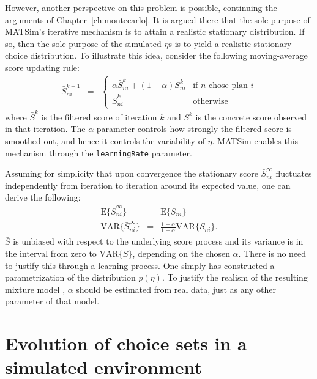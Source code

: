 However, another perspective on this problem is possible, continuing
the arguments of Chapter~\ref{ch:montecarlo}. It is argued there that
the sole purpose of MATSim's iterative mechanism is to attain a realistic
stationary distribution. If so, then the sole purpose of the simulated
$\eta$s is to yield a realistic stationary choice distribution. To
illustrate this idea, consider the following moving-average score
updating rule:
\begin{eqnarray}
\bar{S}_{ni}^{k+1} & = & \begin{cases}
\alpha\bar{S}_{ni}^{k}+(1-\alpha)S_{ni}^{k} & \text{if }n\text{ chose plan }i\\
\bar{S}_{ni}^{k} & \text{otherwise}
\end{cases}
\end{eqnarray}
where $\bar{S}^{k}$ is the filtered score of iteration $k$ and $S^{k}$
is the concrete score observed in that iteration. The $\alpha$ parameter
controls how strongly the filtered score is smoothed out, and hence
it controls the variability of $\eta$. MATSim enables this mechanism
through the \lstinline{learningRate} parameter.

Assuming for simplicity that upon convergence the stationary score
$\bar{S}_{ni}^{\infty}$ fluctuates independently from iteration to
iteration around its expected value, one can derive the following:
\begin{eqnarray}
\text{E}\{\bar{S}_{ni}^{\infty}\} & = & \text{E}\{S_{ni}\}\\
\text{VAR}\{\bar{S}_{ni}^{\infty}\} & = & \frac{1-\alpha}{1+\alpha}\text{VAR}\{S_{ni}\}.
\end{eqnarray}
$\bar{S}$ is unbiased with respect to the underlying score process
and its variance is in the interval from zero to $\text{VAR}\{S\}$,
depending on the chosen $\alpha$. There is no need to justify this
through a learning process. One simply has constructed a parametrization
of the distribution $p(\eta)$. To justify the realism of the resulting
mixture model , $\alpha$ should be
estimated from real data, just as any other parameter of that model.

\section{\label{sec:Evolution-of-choice}Evolution of choice sets in a simulated
environment}

